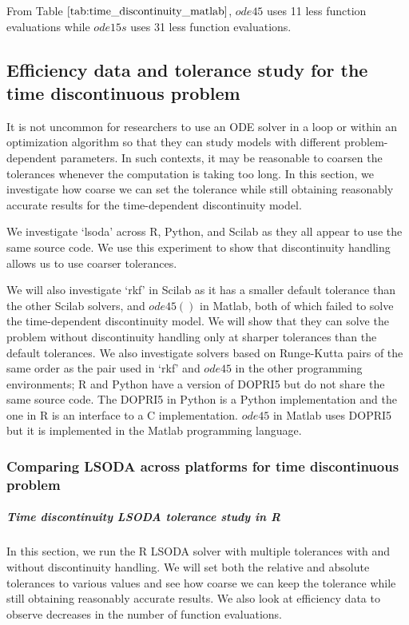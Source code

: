 From Table $\ref{tab:time_discontinuity_matlab}$, $ode45$ uses 11 less function evaluations while $ode15s$ uses 31 less function evaluations.

\subsection{Efficiency data and tolerance study for the time discontinuous problem}
\label{subsection:time_tolerance_study}
It is not uncommon for researchers to use an ODE solver in a loop or within an optimization algorithm so that they can study models with different problem-dependent parameters. In such contexts, it may be reasonable to coarsen the tolerances whenever the computation is taking too long. In this section, we investigate how coarse we can set the tolerance while still obtaining reasonably accurate results for the time-dependent discontinuity model. 

We investigate `lsoda' across R, Python, and Scilab as they all appear to use the same source code. We use this experiment to show that discontinuity handling allows us to use coarser tolerances.

We will also investigate `rkf' in Scilab as it has a smaller default tolerance than the other Scilab solvers, and $ode45()$ in Matlab, both of which failed to solve the time-dependent discontinuity model. We will show that they can solve the problem without discontinuity handling only at sharper tolerances than the default tolerances. We also investigate solvers based on Runge-Kutta pairs of the same order as the pair used in `rkf' and $ode45$ in the other programming environments; R and Python have a version of DOPRI5 but do not share the same source code. The DOPRI5 in Python is a Python implementation and the one in R is an interface to a C implementation. $ode45$ in Matlab uses DOPRI5 but it is implemented in the Matlab programming language.

\subsubsection{Comparing LSODA across platforms for time discontinuous problem}
\subparagraph{Time discontinuity LSODA tolerance study in R}
In this section, we run the R LSODA solver with multiple tolerances with and without discontinuity handling. We will set both the relative and absolute tolerances to various values and see how coarse we can keep the tolerance while still obtaining reasonably accurate results. We also look at efficiency data to observe decreases in the number of function evaluations.

